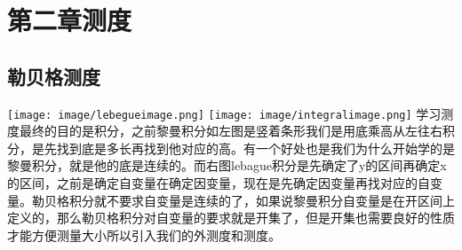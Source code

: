 \documentclass[lang=cn,10pt]{elegantbook}
\begin{document}
\chapter{第二章测度}
\section{勒贝格测度}
\texttt{[image: image/lebegueimage.png]}
\texttt{[image: image/integralimage.png]}
学习测度最终的目的是积分，之前黎曼积分如左图是竖着条形我们是用底乘高从左往右积分，是先找到底是多长再找到他对应的高。有一个好处也是我们为什么开始学的是黎曼积分，就是他的底是连续的。而右图lebague积分是先确定了y的区间再确定x的区间，之前是确定自变量在确定因变量，现在是先确定因变量再找对应的自变量。勒贝格积分就不要求自变量是连续的了，如果说黎曼积分自变量是在开区间上定义的，那么勒贝格积分对自变量的要求就是开集了，但是开集也需要良好的性质才能方便测量大小所以引入我们的外测度和测度。
\end{document}
